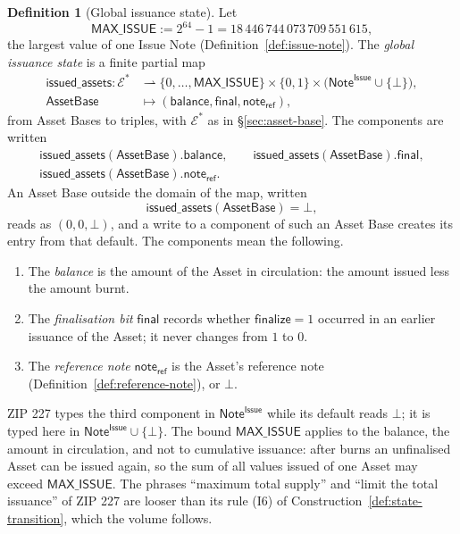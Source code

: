 \documentclass[11pt,a4paper]{article}
\theoremstyle{definition}
\newtheorem{definition}[theorem]{Definition}
\newcommand{\Ep}{\ensuremath{\mathcal{E}}}
\begin{document}
\begin{definition}[Global issuance state]\label{def:issued-assets}
Let
\[
  \mathsf{MAX\_ISSUE} := 2^{64} - 1 = 18\,446\,744\,073\,709\,551\,615,
\]
the largest value of one Issue Note (Definition~\ref{def:issue-note}). The
\emph{global issuance state} is a finite partial map
\begin{align*}
  \mathsf{issued\_assets} \colon \Ep^{*} &\rightharpoonup
  \{0, \dots, \mathsf{MAX\_ISSUE}\} \times \{0, 1\} \times
  \bigl(\mathsf{Note}^{\mathsf{Issue}} \cup \{\bot\}\bigr), \\
  \mathsf{AssetBase} &\mapsto
  (\mathsf{balance}, \mathsf{final}, \mathsf{note}_{\mathsf{ref}}),
\end{align*}
from Asset Bases to triples, with $\Ep^{*}$ as in \S\ref{sec:asset-base}.
The components are written
\begin{gather*}
  \mathsf{issued\_assets}(\mathsf{AssetBase}).\mathsf{balance}, \qquad
  \mathsf{issued\_assets}(\mathsf{AssetBase}).\mathsf{final}, \\
  \mathsf{issued\_assets}(\mathsf{AssetBase}).\mathsf{note}_{\mathsf{ref}}.
\end{gather*}
An Asset Base outside the domain of the map, written
\[
  \mathsf{issued\_assets}(\mathsf{AssetBase}) = \bot,
\]
reads as $(0, 0, \bot)$, and a write to a component of such an Asset Base
creates its entry from that default. The components mean the following.
\begin{enumerate}
\item The \emph{balance} is the amount of the Asset in circulation: the
  amount issued less the amount burnt.
\item The \emph{finalisation bit} $\mathsf{final}$ records whether
  $\mathsf{finalize} = 1$ occurred in an earlier issuance of the Asset; it
  never changes from $1$ to $0$.
\item The \emph{reference note} $\mathsf{note}_{\mathsf{ref}}$ is the
  Asset's reference note (Definition~\ref{def:reference-note}), or $\bot$.
\end{enumerate}
ZIP 227 types the third component in $\mathsf{Note}^{\mathsf{Issue}}$ while
its default reads $\bot$; it is typed here in
$\mathsf{Note}^{\mathsf{Issue}} \cup \{\bot\}$. The bound
$\mathsf{MAX\_ISSUE}$ applies to the balance, the amount in circulation, and
not to cumulative issuance: after burns an unfinalised Asset can be issued
again, so the sum of all values issued of one Asset may exceed
$\mathsf{MAX\_ISSUE}$. The phrases ``maximum total supply'' and ``limit the
total issuance'' of ZIP 227 are looser than its rule (I6) of
Construction~\ref{def:state-transition}, which the volume follows.


\end{definition}
\end{document}
